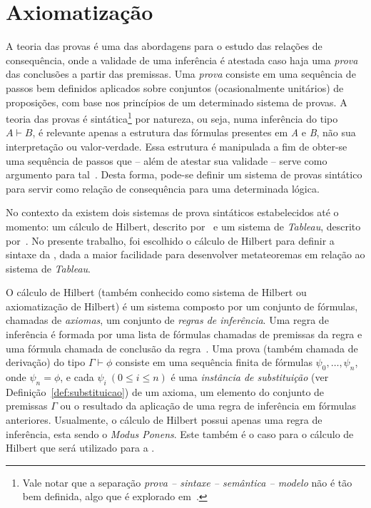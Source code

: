 \section{Axiomatização}
\label{sec:axiomatizacao}

    A teoria das provas é uma das abordagens para o estudo das relações de consequência, onde a validade de uma inferência é atestada caso haja uma \textit{prova} das conclusões a partir das premissas. Uma \textit{prova} consiste em uma sequência de passos bem definidos aplicados sobre conjuntos (ocasionalmente unitários) de proposições, com base nos princípios de um determinado sistema de provas. A teoria das provas é sintática\footnote{Vale notar que a separação \textit{prova {--} sintaxe {--} semântica {--} modelo} não é tão bem definida, algo que é explorado em~.} por natureza, ou seja, numa inferência do tipo $A \vdash B$, é relevante apenas a estrutura das fórmulas presentes em \textit{A} e \textit{B}, não sua interpretação ou valor-verdade. Essa estrutura é manipulada a fim de obter-se uma sequência de passos que {--} além de atestar sua validade {--} serve como argumento para tal~\cite{sep-logical-consequence}. Desta forma, pode-se definir um sistema de provas sintático para servir como relação de consequência para uma determinada lógica. 

    No contexto da \lfium{} existem dois sistemas de prova sintáticos estabelecidos até o momento: um cálculo de Hilbert, descrito por~ e um sistema de \textit{Tableau}, descrito por~. No presente trabalho, foi escolhido o cálculo de Hilbert para definir a sintaxe da \lfium{}, dada a maior facilidade para desenvolver metateoremas em relação ao sistema de \textit{Tableau}.

    O cálculo de Hilbert (também conhecido como sistema de Hilbert ou axiomatização de Hilbert) é um sistema composto por um conjunto de fórmulas, chamadas de \textit{axiomas}, um conjunto de \textit{regras de inferência}. Uma regra de inferência é formada por uma lista de fórmulas chamadas de premissas da regra e uma fórmula chamada de conclusão da regra~\cite{Restall1999-RESAIT-4}. Uma prova (também chamada de derivação) do tipo $\Gamma \vdash \phi$ consiste em uma sequência finita de fórmulas \(\psi_0, \dots, \psi_n\), onde \(\psi_n = \phi\), e cada  $\psi_i\ (0 \leq i \leq n)$ é uma \textit{instância de substituição} (ver Definição~\ref{def:substituicao}) de um axioma, um elemento do conjunto de premissas $\Gamma$ ou o resultado da aplicação de uma regra de inferência em fórmulas anteriores. Usualmente, o cálculo de Hilbert possui apenas uma regra de inferência, esta sendo o \textit{Modus Ponens}. Este também é o caso para o cálculo de Hilbert que será utilizado para a \lfium{}.
    
